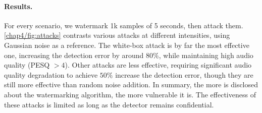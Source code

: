\paragraph*{Results.}
For every scenario, we watermark 1k samples of 5 seconds, then attack them.
\autoref{chap4/fig:attacks} contrasts various attacks at different intensities, using Gaussian noise as a reference.
The white-box attack is by far the most effective one, increasing the detection error by around 80\%, while maintaining high audio quality (PESQ $>4$).
Other attacks are less effective, requiring significant audio quality degradation to achieve $50\%$ increase the detection error, though they are still more effective than random noise addition.
In summary, the more is disclosed about the watermarking algorithm, the more vulnerable it is. 
The effectiveness of these attacks is limited as long as the detector remains confidential.
